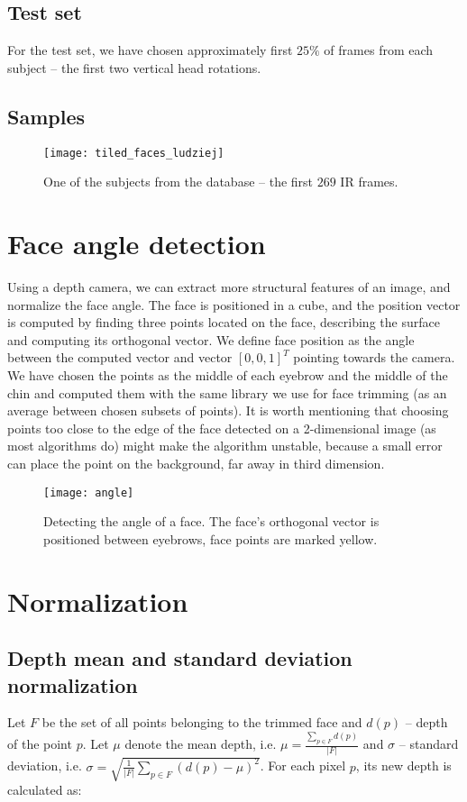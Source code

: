     \subsection*{Test set}
    For the test set, we have chosen approximately first $25\%$ of
    frames from each subject -- the first two vertical head rotations.
    \newpage

    \subsection*{Samples}
    \begin{figure}[H]
    \caption{One of the subjects from the database -- the first $269$ IR frames.}
    \centering
    \texttt{[image: tiled\_faces\_ludziej]}
    \end{figure}

    \section{Face angle detection}
    \label{sec:angledetection}
    Using a depth camera, we can extract more structural features of an image,
    and normalize the face angle. The face is positioned in a cube, and the position vector is computed
    by finding three points located on the face, describing the surface
    and computing its orthogonal vector. We define face position
    as the angle between the computed vector and vector $[0,0,1]^T$ pointing towards the camera.
    We have chosen the points as the middle of each eyebrow and the middle of the chin and computed them with
    the same library we use for face trimming (as an average between chosen subsets of points). It is worth
    mentioning that choosing points too close to the edge of the face
    detected on a 2-dimensional image (as most algorithms do) might make the algorithm unstable, because a small error can place the point on the background,
    far away in third dimension.

    \begin{figure}[H]
    \caption{Detecting the angle of a face. The face's orthogonal vector is positioned between eyebrows, face points are marked yellow.}
    \centering
    \texttt{[image: angle]}
    \end{figure}


    \section{Normalization}
        \subsection*{Depth mean and standard deviation normalization}
        Let $F$ be the set of all points belonging to the trimmed face and
        $d(p)$ -- depth of the point $p$. Let $\mu$ denote the mean depth, i.e.
        $\mu = \frac{\sum\limits_{p \in F}{d(p)}}{|F|}$ and $\sigma$ -- standard
        deviation, i.e. $\sigma = \sqrt{\frac{1}{|F|} \sum\limits_{p \in F}{(d(p) - \mu)^2}}$.
        For each pixel $p$, its new depth is calculated as:


